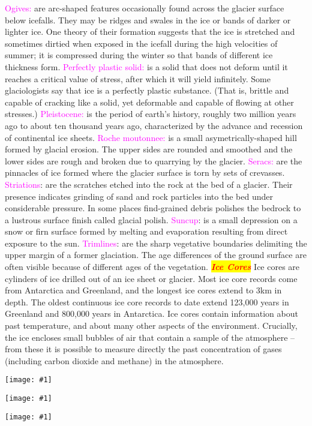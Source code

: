 \documentclass{article}
\newcommand{\red}[1]{\textcolor{red}{#1}}
\newcommand{\pink}[1]{\textcolor{magenta}{#1}}
\newcommand{\mysection}[1]{\colorbox{yellow}{{\textbf{\textbf{\textit{\red{#1}}}}}}}
\newcommand{\vocab}[1]{{\pink{#1}}}
\newcommand{\fig}[1]{
	\texttt{[image: \#1]}
}
\newcommand{\figwidth}[2]{
	\texttt{[image: \#1]}
}
\begin{document}
\begin{multicols*}{4}
		\vocab{Ogives:} are arc-shaped features occasionally found across the glacier surface below icefalls. They may be ridges and swales in the ice or bands of darker or lighter ice. One theory of their formation suggests that the ice is stretched and sometimes dirtied when exposed in the icefall during the high velocities of summer; it is compressed during the winter so that bands of different ice thickness form.
		\vocab{Perfectly plastic solid:} is a solid that does not deform until it reaches a critical value of stress, after which it will yield infinitely. Some glaciologists say that ice is a perfectly plastic substance. (That is, brittle and capable of cracking like a solid, yet deformable and capable of flowing at other stresses.)
		\vocab{Pleistocene:} is the period of earth's history, roughly two million years ago to about ten thousand years ago, characterized by the advance and recession of continental ice sheets.
		\vocab{Roche moutonnee:} is a small asymetrically-shaped hill formed by glacial erosion. The upper sides are rounded and smoothed and the lower sides are rough and broken due to quarrying by the glacier.
		\vocab{Seracs:} are the pinnacles of ice formed where the glacier surface is torn by sets of crevasses.
		\vocab{Striations}: are the scratches etched into the rock at the bed of a glacier. Their presence indicates grinding of sand and rock particles into the bed under considerable pressure. In some places find-grained debris polishes the bedrock to a lustrous surface finish called glacial polish.
		\vocab{Suncup}: is a small depression on a snow or firn surface formed by melting and evaporation resulting from direct exposure to the sun.
		\vocab{Trimlines}: are the sharp vegetative boundaries delimiting the upper margin of a former glaciation. The age differences of the ground surface are often visible because of different ages of the vegetation.
		\mysection{Ice Cores}
		Ice cores are cylinders of ice drilled out of an ice sheet or glacier. Most ice core records come from Antarctica and Greenland, and the longest ice cores extend to 3km in depth. The oldest continuous ice core records to date extend 123,000 years in Greenland and 800,000 years in Antarctica. Ice cores contain information about past temperature, and about many other aspects of the environment. Crucially, the ice encloses small bubbles of air that contain a sample of the atmosphere – from these it is possible to measure directly the past concentration of gases (including carbon dioxide and methane) in the atmosphere.
	   	\fig{basic}
	   	\fig{kettle}
	   	\figwidth{greenlandant}{6}
	\end{multicols*}
\end{document}
